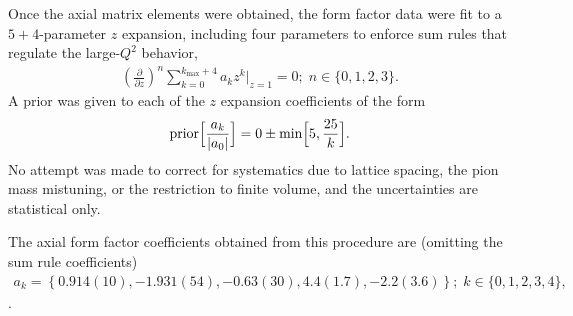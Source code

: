 Once the axial matrix elements were obtained,
 the form factor data were fit to a $5+4$-parameter $z$ expansion,
 including four parameters to enforce sum rules that regulate the large-$Q^2$ behavior,
\begin{align}
 \left( \frac{\partial}{\partial z} \right)^n
 \sum_{k=0}^{k_{\text{max}}+4} a_k z^k \Big|_{z=1} = 0; \; n \in \{0,1,2,3\}.
\end{align}
A prior was given to each of the $z$ expansion coefficients of the form
\begin{align}
 {\rm prior}\Big[ \frac{a_k}{|a_0|} \Big] = 0 \pm {\rm min} \Big[ 5, \frac{25}{k} \Big].
\end{align}
No attempt was made to correct for systematics due to lattice spacing,
 the pion mass mistuning, or the restriction to finite volume,
 and the uncertainties are statistical only.

The axial form factor coefficients obtained from this procedure are
 (omitting the sum rule coefficients)
\begin{align}
 a_k = \left\{ 0.914(10), -1.931(54), -0.63(30), 4.4(1.7), -2.2(3.6) \right\};
 \; k \in \{0,1,2,3,4\},
\end{align}
.

